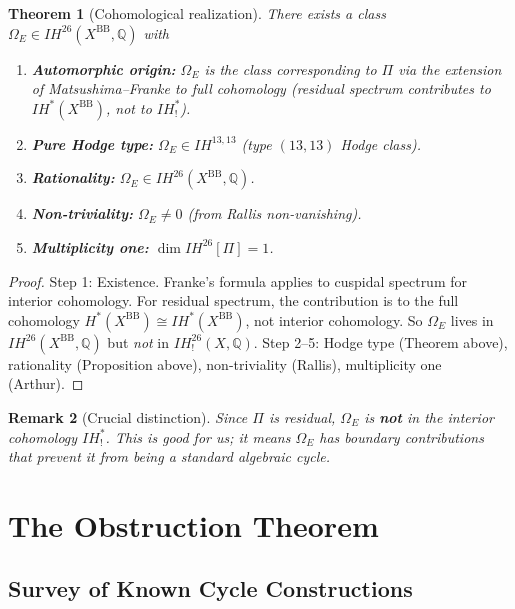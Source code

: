 \documentclass[12pt]{amsart}
\newtheorem{theorem}{Theorem}[section]
\newtheorem{remark}[theorem]{Remark}
\theoremstyle{definition}
\newcommand{\Q}{\mathbb{Q}}
\newcommand{\IH}{\mathit{IH}}
\begin{document}
\begin{theorem}[Cohomological realization]
There exists a class $\Omega_E \in \IH^{26}(X^{\mathrm{BB}}, \Q)$ with
\begin{enumerate}
\item \textbf{Automorphic origin:} $\Omega_E$ is the class corresponding to $\Pi$ via the extension of Matsushima--Franke to full cohomology (residual spectrum contributes to $\IH^*(X^{\mathrm{BB}})$, not to $\IH^*_!$).
\item \textbf{Pure Hodge type:} $\Omega_E \in \IH^{13,13}$ (type $(13, 13)$ Hodge class).
\item \textbf{Rationality:} $\Omega_E \in \IH^{26}(X^{\mathrm{BB}}, \Q)$.
\item \textbf{Non-triviality:} $\Omega_E \neq 0$ (from Rallis non-vanishing).
\item \textbf{Multiplicity one:} $\dim \IH^{26}[\Pi] = 1$.
\end{enumerate}
\end{theorem}
\begin{proof}
Step 1: Existence. Franke's formula applies to cuspidal spectrum for interior cohomology. For residual spectrum, the contribution is to the full cohomology $H^*(X^{\mathrm{BB}}) \cong \IH^*(X^{\mathrm{BB}})$, not interior cohomology. So $\Omega_E$ lives in $\IH^{26}(X^{\mathrm{BB}}, \Q)$ but \emph{not} in $\IH^{26}_!(X, \Q)$. Step 2--5: Hodge type (Theorem above), rationality (Proposition above), non-triviality (Rallis), multiplicity one (Arthur).
\end{proof}

\begin{remark}[Crucial distinction]
Since $\Pi$ is residual, $\Omega_E$ is \textbf{not} in the interior cohomology $\IH^*_!$. This is good for us; it means $\Omega_E$ has boundary contributions that prevent it from being a standard algebraic cycle.
\end{remark}

\section{The Obstruction Theorem}
\label{sec:obstruction}

\subsection{Survey of Known Cycle Constructions}
\label{sec:survey}
\end{document}
